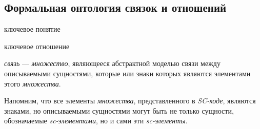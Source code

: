 \begin{SCn}
\begin{comment}
\textbf{\textit{мощность множества}} --- это \textit{параметр}, элементами которых являются \textit{множества}, имеющие одинаковое количество элементов. Значением данного параметра является числовая величина, задающая количество элементов, входящих в данный класс множеств, то есть по сути, количество \textit{позитивных sc-дуг принадлежности}, выходящих из данного \textit{множества}.
	
Для двух множеств, имеющих одинаковую мощность, существует взаимно-однозначное соответствие между ними (между множествами вхождений элементов в эти множества --- на случай мультимножеств).
\end{comment}

\section{Формальная онтология связок и отношений}
\label{sec_top_ontologies_rel}

\begin{SCn}
\begin{scnrelfromlist}{ключевое понятие}
\end{scnrelfromlist}

\begin{scnrelfromlist}{ключевое отношение}
\end{scnrelfromlist}
\end{SCn}

\textit{связь} --- \textit{множество}, являющееся абстрактной моделью связи между описываемыми сущностями, которые или знаки которых являются элементами этого \textit{множества}.

Напомним, что все элементы \textit{множества}, представленного в \textit{SC-коде}, являются знаками, но описываемыми сущностями могут быть не только сущности, обозначаемые \textit{sc-элементами}, но и сами эти \textit{sc-элементы}.

\begin{SCn}
\begin{scnsubdividing}
\end{scnsubdividing}


\end{SCn}
\end{SCn}

